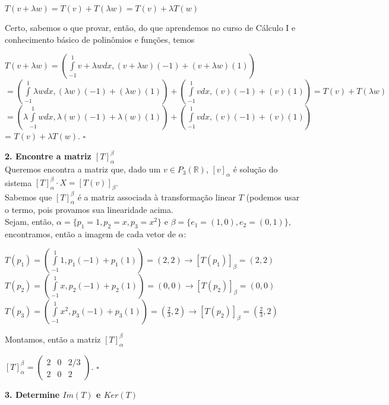\documentclass[12pt]{article}
\begin{document}
	\begin{center}
		$T(v + \lambda w) = T(v) + T(\lambda w) = T(v) + \lambda T(w)$
	\end{center}
	Certo, sabemos o que provar, então, do que aprendemos no curso de Cálculo I e conhecimento básico de polinômios e funções, temos
	\begin{center}
		$T(v + \lambda w) = \left( \int\limits^1_{-1}v + \lambda w dx , (v + \lambda w)(-1) + (v + \lambda w)(1) \right)$\\
		$ = \left( \int\limits^1_{-1} \lambda w dx , (\lambda w)(-1) + (\lambda w)(1) \right) + \left( \int\limits^1_{-1} v dx , (v)(-1) + (v)(1) \right) = T(v) + T(\lambda w) $\\
		$ = \left( \lambda \int\limits^1_{-1} w dx, \lambda(w)(-1) + \lambda(w)(1) \right) + \left( \int\limits^1_{-1} v dx, (v)(-1) + (v)(1) \right)$ = $T(v) + \lambda T(w)$. $\square$
	\end{center}
	\textbf{2. Encontre a matriz $[T]^\beta_\alpha$\\}
	Queremos encontra a matriz que, dado um $v \in 	P_3(\mathbb{R})$, $[v]_\alpha$ é solução do sistema $[T]^\beta_\alpha \cdot X = [T(v)]_\beta$.\\
	Sabemos que $[T]^\beta_\alpha$ é a matriz associada à transformação linear $T$ (podemos usar o termo, pois provamos sua linearidade acima.\\[5pt]
	Sejam, então, $\alpha = \lbrace p_1 = 1, p_2 = x, p_3 = x^2 \rbrace$ e $\beta = \lbrace e_1 = (1,0), e_2 = (0,1)\rbrace$, encontramos, então a imagem de cada vetor de $\alpha$:
	\begin{center}
		$T(p_1) = \left( \int\limits^1_{-1} 1, p_1(-1) + p_1(1) \right) = (2,2) \rightarrow [T(p_1)]_\beta = (2,2)$\\
		$T(p_2) = \left( \int\limits^1_{-1} x, p_2(-1) + p_2(1) \right) = (0,0) \rightarrow [T(p_2)]_\beta = (0,0)$\\
		$T(p_3) = \left( \int\limits^1_{-1} x^2, p_3(-1) + p_3(1) \right) = (\frac{2}{3}, 2) \rightarrow [T(p_2)]_\beta = (\frac{2}{3},2)$\\
	\end{center}
	Montamos, então a matriz $[T]^\beta_\alpha$
	\begin{center}
		$[T]^\beta_\alpha = \begin{pmatrix} 2 & 0 & 2/3 \\ 2 & 0 & 2 \end{pmatrix}$. $\square$
	\end{center}
	\textbf{3. Determine $Im(T)$ e $Ker(T)$\\}
\end{document}
